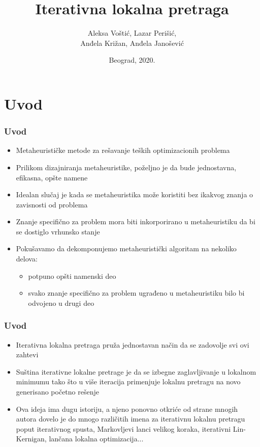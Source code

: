 \documentclass{beamer}
\begin{document}
\title{Iterativna lokalna pretraga}
\author[]{Aleksa Voštić, Lazar Perišić,\\ Anđela Križan, Anđela Janošević}
\date{
	\footnotesize{Beograd, 2020.}	
}

\begin{frame}
	\thispagestyle{empty}
	\titlepage
\end{frame}



\section*{Uvod}
\begin{frame}[fragile]
  \frametitle{Uvod}
	\begin{itemize}
		\item Metaheurističke metode za rešavanje teških optimizacionih problema
		\item Prilikom dizajniranja metaheuristike, poželjno je da bude jednostavna, efikasna, opšte namene
		\item Idealan slučaj je kada se metaheuristika može koristiti bez ikakvog znanja o zavisnosti od problema
		\item Znanje specifično za problem mora biti inkorporirano u metaheuristiku da bi se dostiglo vrhunsko stanje
		\item Pokušavamo da dekomponujemo metaheuristički algoritam na nekoliko delova:
		\begin{itemize}
			\item potpuno opšti namenski deo
			\item svako znanje specifično za problem ugrađeno u metaheuristiku bilo bi odvojeno u drugi deo
		\end{itemize}
	\end{itemize}

\end{frame}

\begin{frame}[fragile]
	\frametitle{Uvod}
	\begin{itemize}
		\item Iterativna lokalna pretraga pruža jednostavan način da se zadovolje svi ovi zahtevi
		\item Suština iterativne lokalne pretrage je da se izbegne zaglavljivanje u lokalnom minimumu tako što u više iteracija primenjuje lokalnu pretragu na novo generisano početno rešenje
		\item Ova ideja ima dugu istoriju, a njeno ponovno otkriće od strane mnogih autora dovelo je do mnogo različitih imena za iterativnu lokalnu pretragu poput iterativnog spusta, Markovljevi lanci velikog koraka, iterativni Lin-Kernigan, lančana lokalna optimizacija...
	\end{itemize}

\end{frame}
\end{document}
